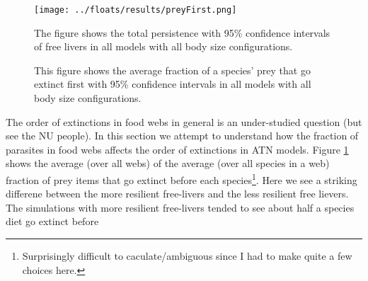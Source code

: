 \documentclass[11pt]{amsart}
\begin{document}
\begin{figure}[h]
\captionsetup[subfigure]{labelfont = it, textfont = it,labelformat = parens,labelsep = space}
    \begin{minipage}{.45\textwidth}
    \end{minipage}
    \begin{minipage}{.45\textwidth}
    \end{minipage}
    \texttt{[image: ../floats/results/preyFirst.png]}
\caption{The figure shows the total persistence with 95\% confidence intervals of free livers in all models with all body size configurations.}
    \begin{minipage}{.45\textwidth}
    \end{minipage}
    \begin{minipage}{.45\textwidth}
    \end{minipage}
\caption{This figure shows the average fraction of a species' prey that go extinct first with 95\% confidence intervals in all models with all body size configurations. \label{fig:frac-prey-first}}
\end{figure}
The order of extinctions in food webs in general is an under-studied question (but see the NU people).  In this section we attempt to understand how the fraction of parasites in food webs affects the order of extinctions in ATN models.  Figure \ref{fig:frac-prey-first} shows the average (over all webs) of the average (over all species in a web) fraction of prey items that go extinct before each species\footnote{Surprisingly difficult to caculate/ambiguous since I had to make quite a few choices here.}.  Here we see a striking differene between the more resilient free-livers and the less resilient free lievers.  The simulations with more resilient free-livers tended to see about half a species diet go extinct before
 
\end{document}
